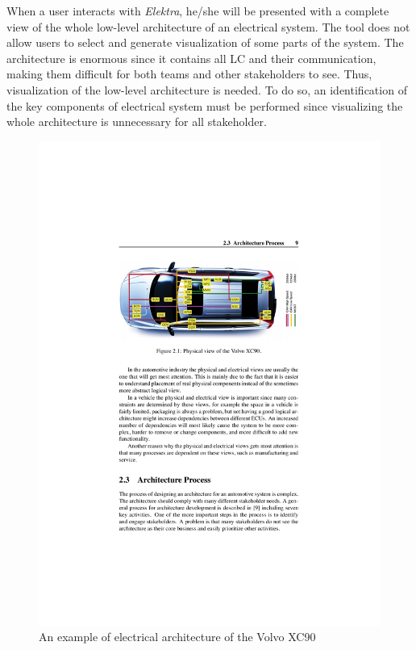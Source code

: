 When a user interacts with \textit{Elektra}, he/she will be presented with a complete view of the whole low-level architecture of an electrical system. The tool does not allow users to select and generate visualization of some parts of the system. The architecture is enormous since it contains all LC and their communication, making them difficult for both teams and other stakeholders to see. Thus, visualization of the low-level architecture is needed. To do so, an identification of the key components of electrical system must be performed since visualizing the whole architecture is unnecessary for all stakeholder. \\

\begin{figure}[H]
\centering
\captionsetup{justification=centering}
\vspace{0cm}%
\includegraphics[width=0.9\linewidth]{figure/literatures/wallin_physical.pdf}
\caption{An example of electrical architecture of the Volvo XC90~\cite{Wallin}}
\end{figure}

